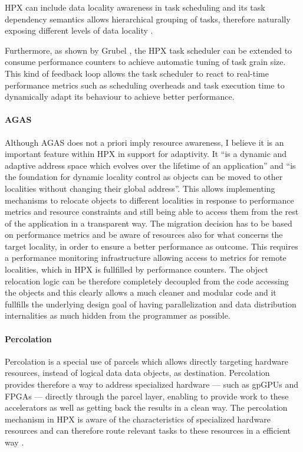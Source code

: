 HPX can include data locality awareness in task scheduling and its task dependency semantics allows hierarchical grouping of tasks, therefore naturally exposing different levels of data locality \cite{amatya2014parallel}.

Furthermore, as shown by Grubel \cite{grubel2016dynamic}, the HPX task scheduler can be extended to consume performance counters to achieve automatic tuning of task grain size. This kind of feedback loop allows the task scheduler to react to real-time performance metrics such as scheduling overheads and task execution time to dynamically adapt its behaviour to achieve better performance.
\\ 

\paragraph{AGAS}
Although AGAS does not a priori imply resource awareness, I believe it is an important feature within HPX in support for adaptivity. It ``is a dynamic and adaptive address space
which evolves over the lifetime of an application'' and ``is the foundation for dynamic locality control as objects can be moved to other localities without changing their global address''.\cite{kaiser2014hpx}
This allows implementing mechanisms to relocate objects to different localities in response to performance metrics and resource constraints \cite{amatya2014parallel} and still being able to access them from the rest of the application in a transparent way. The migration decision has to be based on performance metrics and be aware of resources also for what concerns the target locality, in order to ensure a better performance as outcome. This requires a performance monitoring infrastructure allowing access to metrics for remote localities, which in HPX is fullfilled by performance counters.
The object relocation logic can be therefore completely decoupled from the code accessing the objects and this clearly allows a much cleaner and modular code and it fullfills the underlying design goal of having parallelization and data distribution internalities as much hidden from the programmer as possible.
\\ 

\paragraph{Percolation}
Percolation is a special use of parcels which allows directly targeting hardware resources, instead of logical data data objects, as destination.
Percolation provides therefore a way to address specialized hardware --- such as gpGPUs and FPGAs --- directly through the parcel layer, enabling to provide work to these accelerators as well as getting back the results in a clean way.
The percolation mechanism in HPX is aware of the characteristics of specialized hardware resources and can therefore route relevant tasks to these resources in a efficient way \cite{amatya2014parallel}.
\\ 

